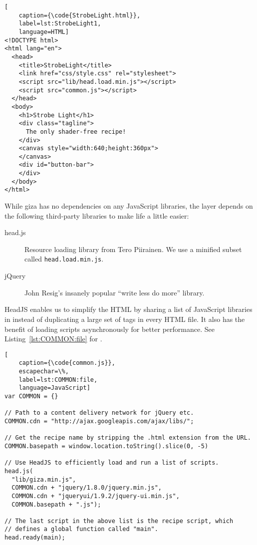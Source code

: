 \begin{lstlisting}[
    caption={\code{StrobeLight.html}},
    label=lst:StrobeLight1,
    language=HTML]
<!DOCTYPE html>
<html lang="en">
  <head>
    <title>StrobeLight</title>
    <link href="css/style.css" rel="stylesheet">
    <script src="lib/head.load.min.js"></script>
    <script src="common.js"></script>
  </head>
  <body>
    <h1>Strobe Light</h1>
    <div class="tagline">
      The only shader-free recipe!
    </div>
    <canvas style="width:640;height:360px">
    </canvas>
    <div id="button-bar">
    </div>
  </body>
</html>
\end{lstlisting} 

While giza has no dependencies on any JavaScript libraries, the  layer depends on the following third-party libraries to make life a little easier:

\begin{description}
\item[head.js] Resource loading library from Tero Piirainen.  We use a minified subset called \texttt{head.load.min.js}.
\item[jQuery] John Resig's insanely popular ``write less do more'' library.
\end{description}

HeadJS enables us to simplify the HTML by sharing a list of JavaScript libraries in  instead of duplicating a large set of  tags in every HTML file.  It also has the benefit of loading scripts asynchronously for better performance.  See Listing~\ref{lst:COMMON:file} for .

\begin{lstlisting}[
    caption={\code{common.js}},
    escapechar=\%,
    label=lst:COMMON:file,
    language=JavaScript]
var COMMON = {}

// Path to a content delivery network for jQuery etc.
COMMON.cdn = "http://ajax.googleapis.com/ajax/libs/";

// Get the recipe name by stripping the .html extension from the URL.
COMMON.basepath = window.location.toString().slice(0, -5)

// Use HeadJS to efficiently load and run a list of scripts.
head.js(
  "lib/giza.min.js",
  COMMON.cdn + "jquery/1.8.0/jquery.min.js",
  COMMON.cdn + "jqueryui/1.9.2/jquery-ui.min.js",
  COMMON.basepath + ".js");

// The last script in the above list is the recipe script, which
// defines a global function called "main".
head.ready(main);
\end{lstlisting} 

